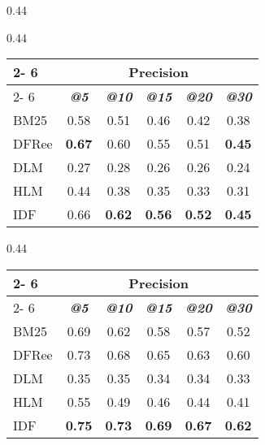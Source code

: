 \begin{table*}[]
\begin{small}
\begin{subtable}[b]{0.44\textwidth}
 	 \end{subtable} \vspace{0.6cm}

 	\begin{subtable}[b]{0.44\textwidth}
 	\caption{2013 collection} 

	\begin{tabular}{l|c|c|c|c|c} 
	
	\cline{2- 6}
	\multicolumn{1}{c}{}&\multicolumn{5}{c}{Precision} \\ 
	\cline{2- 6} &
	\textit{\textbf{@5}} & 
	\textit{\textbf{@10}} & 
	\textit{\textbf{@15}} & 
	\textit{\textbf{@20}} & 
	\textit{\textbf{@30}} 
	
	\tabularnewline
	\hline
BM25 & 0.58 & 0.51 & 0.46 & 0.42 & 0.38 \\
DFRee & \textbf{0.67} & 0.60 & 0.55 & 0.51 & \textbf{0.45} \\
DLM & 0.27 & 0.28 & 0.26 & 0.26 & 0.24 \\
HLM & 0.44 & 0.38 & 0.35 & 0.33 & 0.31 \\
IDF & 0.66 & \textbf{0.62} & \textbf{0.56} & \textbf{0.52} & \textbf{0.45} \\

 	\hline
 	\end{tabular}
 
 	\end{subtable}  
 		 \hspace{2em}
 	  	\begin{subtable}[b]{0.44\textwidth}
 	 
 	  	\centering
 	  	\caption{2014 collection} 
 	 
 	 	\begin{tabular}{l|c|c|c|c|c} 
 	 	
 	 	\cline{2- 6}
 	 	\multicolumn{1}{c}{}&\multicolumn{5}{c}{Precision} \\ 
 	 	\cline{2- 6} &
 	 	\textit{\textbf{@5}} & 
 	 	\textit{\textbf{@10}} & 
 	 	\textit{\textbf{@15}} & 
 	 	\textit{\textbf{@20}} & 
 	 	\textit{\textbf{@30}} 
 	 	
 	 	\tabularnewline
 	 	\hline
	 	 BM25 & 0.69 & 0.62 & 0.58 & 0.57 & 0.52 \\
	 	 DFRee & 0.73 & 0.68 & 0.65 & 0.63 & 0.60 \\
	 	 DLM & 0.35 & 0.35 & 0.34 & 0.34 & 0.33 \\
	 	 HLM & 0.55 & 0.49 & 0.46 & 0.44 & 0.41 \\
	 	 IDF & \textbf{0.75} & \textbf{0.73} & \textbf{0.69} & \textbf{0.67} & \textbf{0.62} \\
 	 

\end{tabular}
\end{subtable}
\end{small}
\end{table*}
